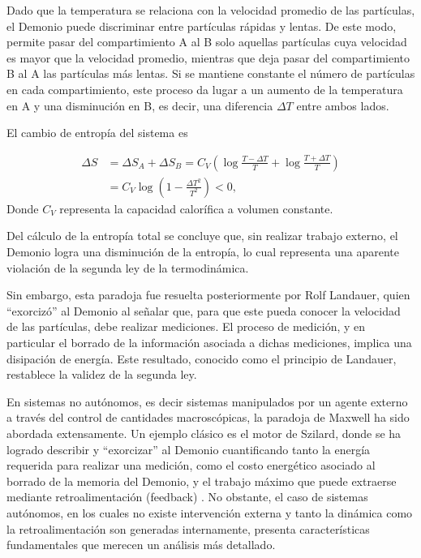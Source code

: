 Dado que la temperatura se relaciona con la velocidad promedio de las partículas, el Demonio puede discriminar entre partículas rápidas y lentas. De este modo, permite pasar del compartimiento A al B solo aquellas partículas cuya velocidad es mayor que la velocidad promedio, mientras que deja pasar del compartimiento B al A las partículas más lentas. Si se mantiene constante el número de partículas en cada compartimiento, este proceso da lugar a un aumento de la temperatura en A y una disminución en B, es decir, una diferencia \( \Delta T \) entre ambos lados.

El cambio de entropía del sistema es
 
\begin{align*}
    \Delta S & = \Delta S_{A} + \Delta S_{B} = C_{V}\left( \log \frac{T-\Delta T}{T} + \log \frac{T+\Delta T}{T} \right) \\
       & =  C_{V} \log \left( 1 - \frac{\Delta T^{2}}{T^{2}}  \right) < 0,
\end{align*}
Donde \( C_V \) representa la capacidad calorífica a volumen constante.

Del cálculo de la entropía total se concluye que, sin realizar trabajo externo, el Demonio logra una disminución de la entropía, lo cual representa una aparente violación de la segunda ley de la termodinámica.

Sin embargo, esta paradoja fue resuelta posteriormente por Rolf Landauer, quien ``exorcizó'' al Demonio al señalar que, para que este pueda conocer la velocidad de las partículas, debe realizar mediciones. El proceso de medición, y en particular el borrado de la información asociada a dichas mediciones, implica una disipación de energía. Este resultado, conocido como el principio de Landauer, restablece la validez de la segunda ley\cite{Landauer_1961}.

En sistemas no autónomos, es decir sistemas manipulados por un agente externo a través del control de cantidades macroscópicas, la paradoja de Maxwell ha sido abordada extensamente. Un ejemplo clásico es el motor de Szilard\cite{szilard1964decrease}, donde se ha logrado describir y ``exorcizar'' al Demonio cuantificando tanto la energía requerida para realizar una medición,  como el costo energético asociado al borrado de la memoria del Demonio, y el trabajo máximo que puede extraerse mediante retroalimentación (feedback) \cite{maruyama2009colloquium, sagawa2008second}. No obstante, el caso de sistemas autónomos, en los cuales no existe intervención externa y tanto la dinámica como la retroalimentación son generadas internamente, presenta características fundamentales que merecen un análisis más detallado.

